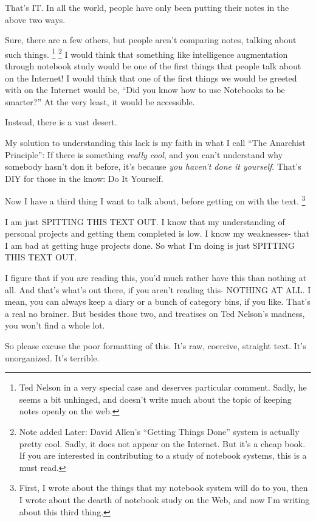 \documentclass[oneside]{book}
\begin{document}
That's IT. In all the world, people have only been putting their notes
in the above two ways.

Sure, there are a few others, but people aren't comparing notes,
talking about such things.
\footnote{Ted Nelson in a very special case 
and deserves particular comment.  Sadly, he seems a bit unhinged, and doesn't 
write much about the topic of keeping notes openly on the web.}
\footnote
{Note 
added Later: David Allen's ``Getting Things Done'' system is
actually pretty cool. Sadly, it does not appear on the Internet. But
it's a cheap book. If you are interested in contributing to a study of
notebook systems, this is a must read.}
I would think that something like
intelligence augmentation through notebook study would be one of the
first things that people talk about on the Internet! I would think
that one of the first things we would be greeted with on the Internet
would be, ``Did you know how to use Notebooks to be smarter?'' At the
very least, it would be accessible.

Instead, there is a vast desert.

My solution to understanding this lack is my faith in what I call ``The
Anarchist Principle'': If there is something \emph{really cool}, and you
can't understand why somebody hasn't don it before, it's because \emph{you
haven't done it yourself}. That's DIY for those in the know: Do It Yourself.

Now I have a third thing I want to talk about, before getting on with
the text.
\footnote
{First, I wrote about the things that my notebook system will do to
you, then I wrote about the dearth of notebook study on the Web, and
now I'm writing about this third thing.}

I am just SPITTING THIS TEXT OUT. I know that my understanding of
personal projects and getting them completed is low. I know my
weaknesses- that I am bad at getting huge projects done. So what I'm
doing is just SPITTING THIS TEXT OUT.

I figure that if you are reading this, you'd much rather have this
than nothing at all. And that's what's out there, if you aren't
reading this- NOTHING AT ALL. I mean, you can always keep a diary or a
bunch of category bins, if you like. That's a real no brainer. But
besides those two, and treatises on Ted Nelson's madness, you won't
find a whole lot.

So please excuse the poor formatting of this. It's raw, coercive,
straight text. It's unorganized. It's terrible.
\end{document}
